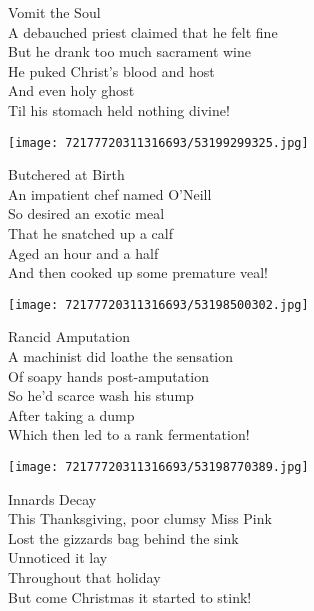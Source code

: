 \documentclass[10pt,letterpaper]{article}
\begin{document}
\begin{center}
Vomit the Soul\\
\vskip 0.2in
A debauched priest claimed that he felt fine\\
But he drank too much sacrament wine\\
He puked Christ's blood and host\\
And even holy ghost\\
Til his stomach held nothing divine!\\
\end{center}
\pagebreak

\begin{center}\texttt{[image: 72177720311316693/53199299325.jpg]}
\end{center}
\begin{center}
Butchered at Birth\\
\vskip 0.2in
An impatient chef named O'Neill\\
So desired an exotic meal\\
That he snatched up a calf\\
Aged an hour and a half\\
And then cooked up some premature veal!\\
\end{center}
\pagebreak

\begin{center}\texttt{[image: 72177720311316693/53198500302.jpg]}
\end{center}
\begin{center}
Rancid Amputation\\
\vskip 0.2in
A machinist did loathe the sensation\\
Of soapy hands post-amputation\\
So he'd scarce wash his stump\\
After taking a dump\\
Which then led to a rank fermentation!\\
\end{center}
\pagebreak

\begin{center}\texttt{[image: 72177720311316693/53198770389.jpg]}
\end{center}
\begin{center}
Innards Decay\\
\vskip 0.2in
This Thanksgiving, poor clumsy Miss Pink\\
Lost the gizzards bag behind the sink\\
Unnoticed it lay\\
Throughout that holiday\\
But come Christmas it started to stink!\\
\end{center}
\pagebreak
\end{document}
